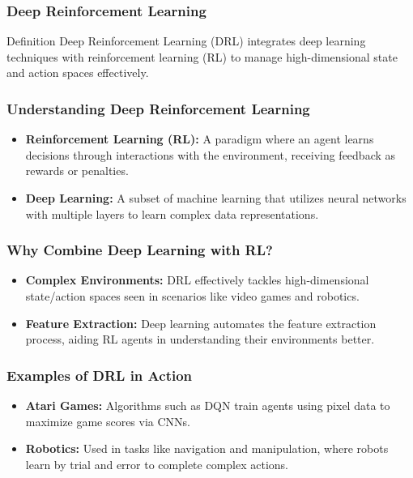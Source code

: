 \documentclass[aspectratio=169]{beamer}
\begin{document}
\begin{frame}[fragile]
    \frametitle{Deep Reinforcement Learning}
    \begin{block}{Definition}
        Deep Reinforcement Learning (DRL) integrates deep learning techniques with reinforcement learning (RL) to manage high-dimensional state and action spaces effectively.
    \end{block}
\end{frame}

\begin{frame}[fragile]
    \frametitle{Understanding Deep Reinforcement Learning}
    \begin{itemize}
        \item \textbf{Reinforcement Learning (RL):} A paradigm where an agent learns decisions through interactions with the environment, receiving feedback as rewards or penalties.
        \item \textbf{Deep Learning:} A subset of machine learning that utilizes neural networks with multiple layers to learn complex data representations.
    \end{itemize}
\end{frame}

\begin{frame}[fragile]
    \frametitle{Why Combine Deep Learning with RL?}
    \begin{itemize}
        \item \textbf{Complex Environments:} DRL effectively tackles high-dimensional state/action spaces seen in scenarios like video games and robotics.
        \item \textbf{Feature Extraction:} Deep learning automates the feature extraction process, aiding RL agents in understanding their environments better.
    \end{itemize}
\end{frame}

\begin{frame}[fragile]
    \frametitle{Examples of DRL in Action}
    \begin{itemize}
        \item \textbf{Atari Games:} Algorithms such as DQN train agents using pixel data to maximize game scores via CNNs.
        \item \textbf{Robotics:} Used in tasks like navigation and manipulation, where robots learn by trial and error to complete complex actions.
    \end{itemize}
\end{frame}
\end{document}
